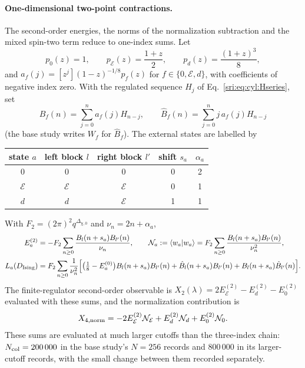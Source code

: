 \paragraph{One-dimensional two-point contractions.} The second-order energies, the norms of the normalization
subtraction and the mixed spin-two term reduce to one-index sums. Let
\begin{equation}
 p_0(z)=1,\qquad p_{\mathcal E}(z)=\frac{1+z}{2},\qquad p_d(z)=\frac{(1+z)^3}{8},
\end{equation}
and $a_f(j)=[z^j](1-z)^{-1/8}p_f(z)$ for $f\in\{0,\mathcal E,d\}$, with coefficients of negative index zero. With the
regulated sequence $H_j$ of Eq.~\eqref{sri:eq:cyl:Hseries}, set
\begin{equation}
 B_f(n)=\sum_{j=0}^na_f(j)H_{n-j},\qquad \hat B_f(n)=\sum_{j=0}^nj\,a_f(j)H_{n-j}
\end{equation}
(the base study writes $W_f$ for $\hat B_f$). The external states are labelled by
\begin{center}\small
\begin{tabular}{@{}ccccc@{}}
\toprule
state $a$ & left block $l$ & right block $l'$ & shift $s_a$ & $\alpha_a$\\
\midrule
$0$ & $0$ & $0$ & 0 & 2\\
$\mathcal E$ & $\mathcal E$ & $\mathcal E$ & 0 & 1\\
$d$ & $d$ & $\mathcal E$ & 1 & 1\\
\bottomrule
\end{tabular}
\end{center}
With $F_2=(2\pi)^2q^{\Delta_{\chi,0}}$ and $\nu_n=2n+\alpha_a$,
\begin{equation}
\begin{aligned}
 E_a^{(2)}&=-F_2\sum_{n\ge0}\frac{B_l(n+s_a)B_{l'}(n)}{\nu_n},\qquad
 \mathcal N_a:=\langle w_a\vert w_a\rangle=F_2\sum_{n\ge0}\frac{B_l(n+s_a)B_{l'}(n)}{\nu_n^2},\\
 L_a(D_{\rm Ising})&=F_2\sum_{n\ge0}\frac1{\nu_n^2}\Bigl[\bigl(\tfrac18-E_a^{(0)}\bigr)B_l(n+s_a)B_{l'}(n)
 +\hat B_l(n+s_a)B_{l'}(n)+B_l(n+s_a)\hat B_{l'}(n)\Bigr].
\end{aligned}
\label{sri:eq:cyl:collapsed}
\end{equation}
The finite-regulator second-order observable is $X_2(\lambda)=2E_{\mathcal E}^{(2)}-E_d^{(2)}-E_0^{(2)}$ evaluated with
these sums, and the normalization contribution is
\begin{equation}
 X_{4,\rm norm}=-2E_{\mathcal E}^{(2)}\mathcal N_{\mathcal E}+E_d^{(2)}\mathcal N_d+E_0^{(2)}\mathcal N_0.
\end{equation}
These sums are evaluated at much larger cutoffs than the three-index chain: $N_{\rm col}=200\,000$ in the base study's
$N=256$ records and $800\,000$ in its larger-cutoff records, with the small change between them recorded separately.


